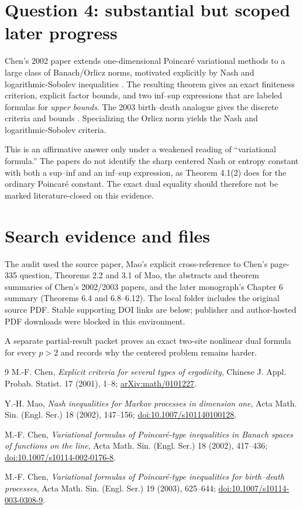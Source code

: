 \documentclass[11pt]{article}
\begin{document}
\section*{Question 4: substantial but scoped later progress}
Chen's 2002 paper extends one-dimensional Poincar\'e variational methods to a
large class of Banach/Orlicz norms, motivated explicitly by Nash and
logarithmic-Sobolev inequalities \cite{Chen02}.  The resulting theorem gives
an exact finiteness criterion, explicit factor bounds, and two inf--sup
expressions that are labeled formulas for \emph{upper bounds}.  The 2003
birth--death analogue gives the discrete criteria and bounds \cite{Chen03}.
Specializing the Orlicz norm yields the Nash and logarithmic-Sobolev criteria.

This is an affirmative answer only under a weakened reading of ``variational
formula.''  The papers do not identify the sharp centered Nash or entropy
constant with both a sup--inf and an inf--sup expression, as Theorem 4.1(2)
does for the ordinary Poincar\'e constant.  The exact dual equality should
therefore not be marked literature-closed on this evidence.

\section*{Search evidence and files}
The audit used the source paper, Mao's explicit cross-reference to Chen's
page-335 question, Theorems 2.2 and 3.1 of Mao, the abstracts and theorem
summaries of Chen's 2002/2003 papers, and the later monograph's Chapter 6
summary (Theorems 6.4 and 6.8--6.12).  The local folder includes the original
source PDF.  Stable supporting DOI links are below; publisher and
author-hosted PDF downloads were blocked in this environment.

A separate partial-result packet proves an exact two-site nonlinear dual
formula for every $p>2$ and records why the centered problem remains harder.

\begin{thebibliography}{9}
M.-F. Chen,
\emph{Explicit criteria for several types of ergodicity},
Chinese J. Appl. Probab. Statist. 17 (2001), 1--8;
\href{https://arxiv.org/abs/math/0101227}{arXiv:math/0101227}.

Y.-H. Mao,
\emph{Nash inequalities for Markov processes in dimension one},
Acta Math. Sin. (Engl. Ser.) 18 (2002), 147--156;
\href{https://doi.org/10.1007/s101140100128}{doi:10.1007/s101140100128}.

M.-F. Chen,
\emph{Variational formulas of Poincar\'e-type inequalities in Banach spaces
of functions on the line},
Acta Math. Sin. (Engl. Ser.) 18 (2002), 417--436;
\href{https://doi.org/10.1007/s10114-002-0176-8}{doi:10.1007/s10114-002-0176-8}.

M.-F. Chen,
\emph{Variational formulas of Poincar\'e-type inequalities for birth--death
processes},
Acta Math. Sin. (Engl. Ser.) 19 (2003), 625--644;
\href{https://doi.org/10.1007/s10114-003-0308-9}{doi:10.1007/s10114-003-0308-9}.
\end{thebibliography}
\end{document}
